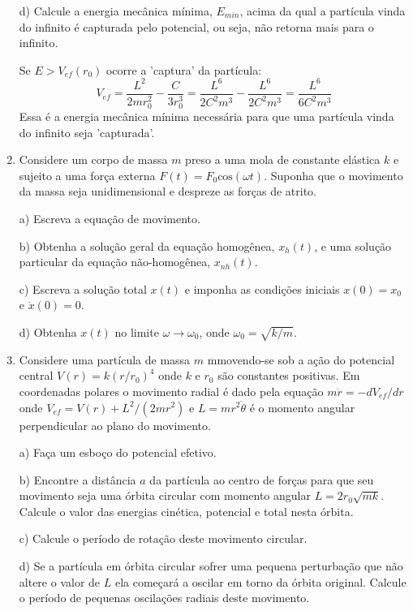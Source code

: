 \begin{enumerate}[start=1,label={\bfseries Q\arabic*.}]
d) Calcule a energia mecânica mínima, $E_{min}$, acima da qual a partícula vinda do infinito é capturada pelo potencial, ou seja, não retorna mais para o infinito.

\resposta Se $E > V_{ef}(r_{0})$ ocorre a 'captura' da partícula:
$$
V_{ef} = \frac{L^{2}}{2mr_{0}^{2}} - \frac{C}{3r_{0}^{3}} = \frac{L^{6}}{2C^{2}m^{3}} - \frac{L^{6}}{2C^{2}m^{3}} = \frac{L^{6}}{6C^{2}m^{3}}
$$
Essa é a energia mecânica mínima necessária para que uma partícula vinda do infinito seja 'capturada'.









\item Considere um corpo de massa $m$ preso a uma mola de constante elástica $k$ e sujeito a uma força externa $F(t) = F_{0} \mathrm{cos} (\omega t)$. Suponha que o movimento da massa seja unidimensional e despreze as forças de atrito.


a) Escreva a equação de movimento.

\resposta

b) Obtenha a solução geral da equação homogênea, $x_{h}(t)$, e uma solução particular da equação não-homogênea, $x_{nh}(t)$.

\resposta

c) Escreva a solução total $x(t)$ e imponha as condições iniciais $x(0) = x_{0}$ e $\dot{x}(0) = 0$.

\resposta
  
d) Obtenha $x(t)$ no limite $\omega \rightarrow \omega_{0}$, onde $\omega_{0} = \sqrt{k/m}$.

\resposta


\item Considere uma partícula de massa $m$ mmovendo-se sob a ação do potencial central $V(r) = k(r/r_{0})^{4}$ onde $k$ e $r_{0}$ são constantes positivas. Em coordenadas polares o movimento radial é dado pela equação $m\ddot{r} = - d V_{ef}/dr$ onde $V_{ef} = V(r) + L^{2}/(2mr^{2})$ e $L = mr^{2} \dot{\theta}$ é o momento angular perpendicular ao plano do movimento.


a) Faça um esboço do potencial efetivo.

\resposta

b) Encontre a distância $a$ da partícula ao centro de forças para que seu movimento seja uma órbita circular com momento angular $L = 2 r_{0} \sqrt{mk}$. Calcule o valor das energias cinética, potencial e total nesta órbita.

\resposta

c) Calcule o período de rotação deste movimento circular.

\resposta

d) Se a partícula em órbita circular sofrer uma pequena perturbação que não altere o valor de $L$ ela começará a oscilar em torno da órbita original. Calcule o período de pequenas oscilações radiais deste movimento.

\resposta




\end{enumerate}






